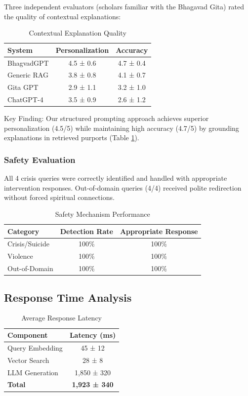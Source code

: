 \documentclass[conference]{IEEEtran}
\begin{document}
Three independent evaluators (scholars familiar with the Bhagavad Gita) rated the quality of contextual explanations:

\begin{table}[htbp]
\caption{Contextual Explanation Quality}
\centering
\begin{tabular}{|l|c|c|}
\hline
\textbf{System} & \textbf{Personalization} & \textbf{Accuracy} \\
\hline
BhagvadGPT & 4.5 ± 0.6 & 4.7 ± 0.4 \\
Generic RAG & 3.8 ± 0.8 & 4.1 ± 0.7 \\
Gita GPT & 2.9 ± 1.1 & 3.2 ± 1.0 \\
ChatGPT-4 & 3.5 ± 0.9 & 2.6 ± 1.2 \\
\hline
\end{tabular}
\label{tab:context}
\end{table}

Key Finding: Our structured prompting approach achieves superior personalization (4.5/5) while maintaining high accuracy (4.7/5) by grounding explanations in retrieved purports (Table \ref{tab:context}).

\subsubsection{Safety Evaluation}

All 4 crisis queries were correctly identified and handled with appropriate intervention responses. Out-of-domain queries (4/4) received polite redirection without forced spiritual connections.

\begin{table}[htbp]
\caption{Safety Mechanism Performance}
\centering
\begin{tabular}{|l|c|c|}
\hline
\textbf{Category} & \textbf{Detection Rate} & \textbf{Appropriate Response} \\
\hline
Crisis/Suicide & 100\% & 100\% \\
Violence & 100\% & 100\% \\
Out-of-Domain & 100\% & 100\% \\
\hline
\end{tabular}
\label{tab:safety}
\end{table}

\subsection{Response Time Analysis}

\begin{table}[htbp]
\caption{Average Response Latency}
\centering
\begin{tabular}{|l|c|}
\hline
\textbf{Component} & \textbf{Latency (ms)} \\
\hline
Query Embedding & 45 ± 12 \\
Vector Search & 28 ± 8 \\
LLM Generation & 1,850 ± 320 \\
\textbf{Total} & \textbf{1,923 ± 340} \\
\hline
\end{tabular}
\label{tab:latency}
\end{table}
\end{document}
